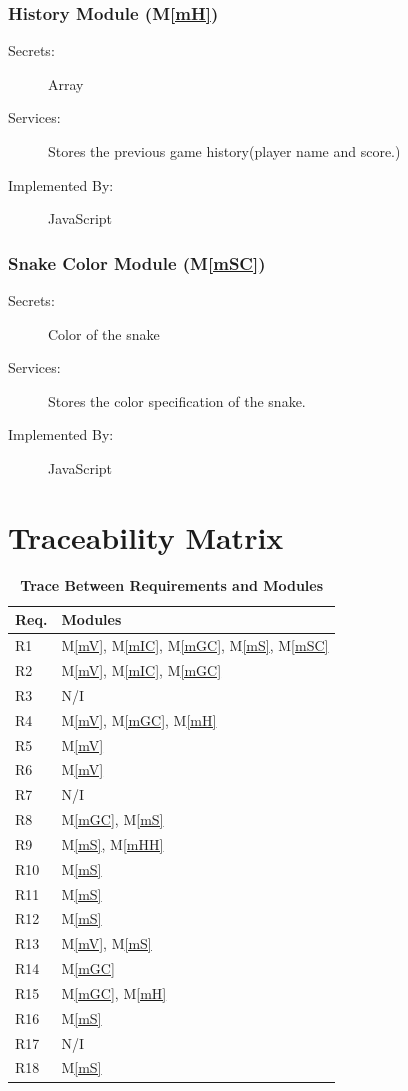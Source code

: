 \documentclass[12pt, titlepage]{article}
\newcommand{\mref}[1]{M\ref{#1}}
\begin{document}
\subsubsection{History Module (\mref{mH})}
\begin{description}
\item[Secrets:]Array
\item[Services:]Stores the previous game history(player name and score.)
\item[Implemented By:]JavaScript
\end{description}

\subsubsection{Snake Color Module (\mref{mSC})}
\begin{description}
\item[Secrets:]Color of the snake
\item[Services:]Stores the color specification of the snake.
\item[Implemented By:]JavaScript
\end{description}

\section{Traceability Matrix} \label{SecTM}
\begin{table}[H]
\centering
\begin{tabular}{p{} p{}}
\toprule
\textbf{Req.} & \textbf{Modules}\\
\midrule
R1 & \mref{mV}, \mref{mIC}, \mref{mGC}, \mref{mS}, \mref{mSC}\\
R2 & \mref{mV}, \mref{mIC}, \mref{mGC}\\
R3 & N/I\\
R4 & \mref{mV}, \mref{mGC}, \mref{mH}\\
R5 & \mref{mV}\\
R6 & \mref{mV}\\
R7 & N/I\\
R8 & \mref{mGC}, \mref{mS}\\
R9 & \mref{mS}, \mref{mHH}\\
R10 & \mref{mS}\\
R11 & \mref{mS}\\
R12 & \mref{mS}\\
R13 & \mref{mV}, \mref{mS}\\
R14 & \mref{mGC}\\
R15 & \mref{mGC}, \mref{mH}\\
R16 & \mref{mS}\\
R17 & N/I\\
R18 & \mref{mS}\\
\bottomrule
\end{tabular}
\caption{\textbf{Trace Between Requirements and Modules}}
\label{TblRT}
\end{table}
\end{document}
